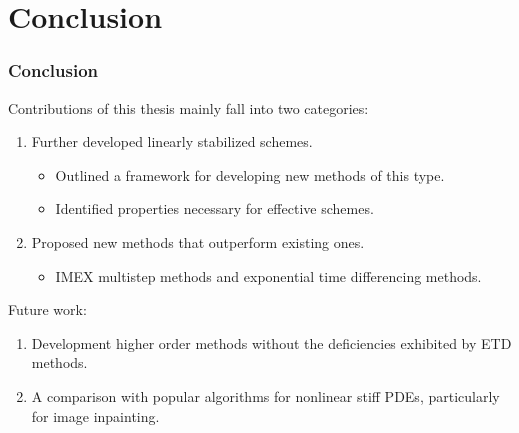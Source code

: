 \documentclass[hyperref={pdfpagelabels=false}]{beamer}
\begin{document}
\section{Conclusion}
\begin{frame}
	\frametitle{Conclusion}
	Contributions of this thesis mainly fall into two categories:
\begin{enumerate}
	\item Further developed linearly stabilized schemes.
	\begin{itemize}
		\item Outlined a framework for developing new methods of this type. 
		
		\item Identified properties necessary for effective schemes. 
	\end{itemize}
	
	\item Proposed new methods that outperform existing ones. 
	\begin{itemize}
		\item IMEX multistep methods and exponential time differencing methods. 
	\end{itemize}
\end{enumerate}	

Future work: 
\begin{enumerate}
	\item Development higher order methods without the deficiencies exhibited by ETD methods.
	
	\item A comparison with popular algorithms for nonlinear stiff PDEs, particularly for image inpainting.
\end{enumerate}
\end{frame}
\end{document}
